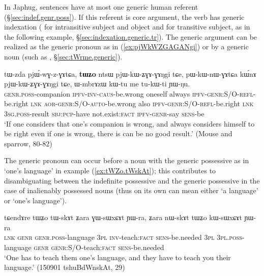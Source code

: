 In Japhug, sentences have at most one generic human referent (§\ref{sec:indef.genr.poss}). If this referent is core argument, the verb has generic indexation ( for intransitive subject and object and  for transitive subject, as in the following example, §\ref{sec:indexation.generic.tr}). The generic argument can be realized as the generic pronoun  as in (\ref{ex:pjWkWZGAGANgi}) or by a generic noun (such as , §\ref{sec:tWrme.generic}).

\begin{exe}
\ex \label{ex:pjWkWZGAGANgi}
\gll tɯ-zda pjɯ́-wɣ-z-ɣɤtɕa, \textbf{tɯʑo} ntsɯ pjɯ-kɯ-ʑɣɤ-ɣɤŋgi tɕe, pɯ-kɯ-nɯ-ɣɤtɕa kɯ́nɤ pjɯ-kɯ-ʑɣɤ-ɣɤŋgi tɕe, ɯ-mbrɤzɯ kɯ-tu me tu-kɯ-ti ɲɯ-ŋu.   \\
\textsc{genr}.\textsc{poss}-companion \textsc{ipfv}-\textsc{inv}-\textsc{caus}-be.wrong oneself always \textsc{ipfv}-\textsc{genr}:S/O-\textsc{refl}-be.right \textsc{lnk} \textsc{aor}-\textsc{genr}:S/O-\textsc{auto}-be.wrong also \textsc{ipfv}-\textsc{genr}:S/O-\textsc{refl}-be.right \textsc{lnk} \textsc{3sg}.\textsc{poss}-result \textsc{sbj}:\textsc{pcp}-have  not.exist:\textsc{fact} \textsc{ipfv}-\textsc{genr}-say \textsc{sens}-be \\
\glt  `If one considers that one's companion is wrong, and always considers himself to be right even if one is wrong, there is can be no good result.' (Mouse and sparrow, 80-82)
\end{exe} 

The generic pronoun can occur before a noun with the generic possessive as in   `one's language' in example (\ref{ex:tWZo.tWskAt}); this contributes to disambiguating between the indefinite possessive and the generic possessive in the case of inalienably possessed nouns (thus on its own  can mean either `a language' or `one's language').

\begin{exe}
\ex \label{ex:tWZo.tWskAt}
\gll tɕendɤre tɯʑo tɯ-skɤt ʑara ɣɯ-sɯxɕɤt ɲɯ-ra, ʑara nɯ-skɤt tɯʑo kɯ-sɯxɕɤt ɲɯ-ra \\
\textsc{lnk} \textsc{genr} \textsc{genr}.\textsc{poss}-language \textsc{3pl} \textsc{inv}-teach:\textsc{fact} \textsc{sens}-be.needed \textsc{3pl} \textsc{3pl}.\textsc{poss}-language \textsc{genr} \textsc{genr}:S/O-teach:\textsc{fact} \textsc{sens}-be.needed \\
\glt `One has to teach them one's language, and they have to teach you their language.'  (150901 tshuBdWnskAt, 29)
\end{exe} 

